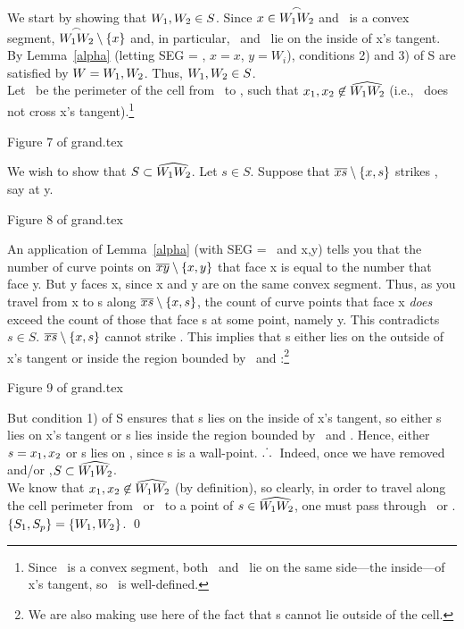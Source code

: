 We start by showing that $\mbox{$W_{1}$},\mbox{$W_{2}$} \in S$.
Since $x \in \mbox{$\stackrel{\frown}{\mbox{$W_{1}W_{2}$}}$}$ and \wwa\ is a convex segment, $\mbox{$\stackrel{\frown}{\mbox{$W_{1}W_{2}$}}$} \setminus \{x\}$
and, in particular, \wone\ and \wtwo\ lie on the inside of
x's tangent.
By Lemma~\ref{alpha} (letting SEG = \wwa, $x=x$, $y=W_{i}$), 
conditions 2) and 3) of S are satisfied by $W=\mbox{$W_{1}$},\mbox{$W_{2}$}$.
Thus, $\mbox{$W_{1}$},\mbox{$W_{2}$} \in S$.\\
Let \wwh\ be the perimeter of the cell from \wone\ to \wtwo, 
such that $\mbox{$x_{1}$},\mbox{$x_{2}$} \not\in\mbox{$\widehat{\mbox{$W_{1}W_{2}$}}$}$ (i.e., \wwh\ does
not cross x's tangent).\footnote{Since \wwa\ is a convex segment, both \wone\ 
and \wtwo\ lie on the same 
side---the inside---of x's tangent, so \wwh\ is well-defined.}
\begin{center}
Figure 7 of grand.tex
\end{center}
We wish to show that $S \subset \mbox{$\widehat{\mbox{$W_{1}W_{2}$}}$}$.
Let $s \in S$.
Suppose that $\mbox{$\overline{xs}$} \setminus \{x,s\}$ strikes \wwa, say at y.
\begin{center}
Figure 8 of grand.tex
\end{center}
An application of Lemma~\ref{alpha} (with SEG = \wwa\ and x,y)
tells you that the number of curve points 
on $\mbox{$\overline{xy}$} \setminus \{x,y\}$ that face x is equal to the number that 
face y.
But y faces x, since x and y are on the same convex segment.
Thus, as you travel from x to s along $\mbox{$\overline{xs}$} \setminus \{x,s\}$,
the count of curve points that face x {\em does} exceed the count
of those that face s at some point, namely y.
This contradicts $s\in S$.
\hence $\mbox{$\overline{xs}$} \setminus \{x,s\}$ cannot strike \wwa.
This implies that s either lies on the outside of x's tangent or
inside the region bounded by \wwh\ and \wwa:\footnote{We are also
making use here of the fact that s cannot lie outside of the cell.}
\begin{center}
Figure 9 of grand.tex
\end{center}
But condition 1) of S ensures that s lies on the inside of
x's tangent, so either s lies on  x's tangent or s lies inside
the region bounded by \wwh\ and \wwa.
Hence, either $s = \mbox{$x_{1}$},\mbox{$x_{2}$}$ or s lies on \wwh, since s is a wall-point.
\mbox{$.\raisebox{1.5ex}{.}.$}\ Indeed, once we have removed \xone and/or \xtwo,$S \subset \mbox{$\widehat{\mbox{$W_{1}W_{2}$}}$}$.\\
We know that $\mbox{$x_{1}$},\mbox{$x_{2}$} \not\in \mbox{$\widehat{\mbox{$W_{1}W_{2}$}}$}$ (by definition), 
so clearly, in order to travel
along the cell perimeter from \xone\ or \xtwo\ to a point of $s \in \mbox{$\widehat{\mbox{$W_{1}W_{2}$}}$}$,
one must pass through \wone\ or \wtwo.
\hence $\{S_{1},S_{p}\} = \{\mbox{$W_{1}$},\mbox{$W_{2}$}\}$.
\qed
